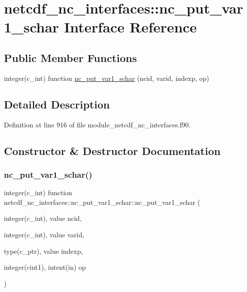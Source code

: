 \hypertarget{interfacenetcdf__nc__interfaces_1_1nc__put__var1__schar}{}\section{netcdf\+\_\+nc\+\_\+interfaces\+:\+:nc\+\_\+put\+\_\+var1\+\_\+schar Interface Reference}
\label{interfacenetcdf__nc__interfaces_1_1nc__put__var1__schar}
\subsection*{Public Member Functions}
\begin{DoxyCompactItemize}
\item 
integer(c\+\_\+int) function \hyperlink{interfacenetcdf__nc__interfaces_1_1nc__put__var1__schar_ab674f737c46d732dca5d5163ce0193c9}{nc\+\_\+put\+\_\+var1\+\_\+schar} (ncid, varid, indexp, op)
\end{DoxyCompactItemize}


\subsection{Detailed Description}


Definition at line 916 of file module\+\_\+netcdf\+\_\+nc\+\_\+interfaces.\+f90.



\subsection{Constructor \& Destructor Documentation}
\mbox{\label{interfacenetcdf__nc__interfaces_1_1nc__put__var1__schar_ab674f737c46d732dca5d5163ce0193c9}} 
\subsubsection{\texorpdfstring{nc\+\_\+put\+\_\+var1\+\_\+schar()}{nc\_put\_var1\_schar()}}
{\footnotesize\ttfamily integer(c\+\_\+int) function netcdf\+\_\+nc\+\_\+interfaces\+::nc\+\_\+put\+\_\+var1\+\_\+schar\+::nc\+\_\+put\+\_\+var1\+\_\+schar (\begin{DoxyParamCaption}\item[{integer(c\+\_\+int), value}]{ncid,  }\item[{integer(c\+\_\+int), value}]{varid,  }\item[{type(c\+\_\+ptr), value}]{indexp,  }\item[{integer(cint1), intent(in)}]{op }\end{DoxyParamCaption})}



